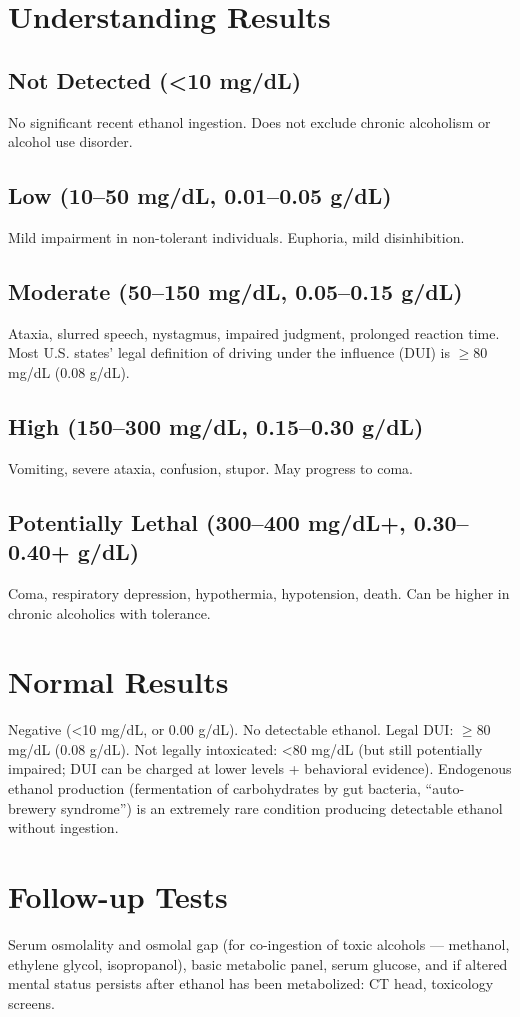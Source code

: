 \section*{Understanding Results}
\subsection*{Not Detected (<10 mg/dL)}
No significant recent ethanol ingestion. Does not exclude chronic alcoholism or alcohol use disorder.
\subsection*{Low (10--50 mg/dL, 0.01--0.05 g/dL)}
Mild impairment in non-tolerant individuals. Euphoria, mild disinhibition.
\subsection*{Moderate (50--150 mg/dL, 0.05--0.15 g/dL)}
Ataxia, slurred speech, nystagmus, impaired judgment, prolonged reaction time. Most U.S. states' legal definition of driving under the influence (DUI) is $\geq$80 mg/dL (0.08 g/dL).
\subsection*{High (150--300 mg/dL, 0.15--0.30 g/dL)}
Vomiting, severe ataxia, confusion, stupor. May progress to coma.
\subsection*{Potentially Lethal (300--400 mg/dL+, 0.30--0.40+ g/dL)}
Coma, respiratory depression, hypothermia, hypotension, death. Can be higher in chronic alcoholics with tolerance.
\section*{Normal Results}
Negative (<10 mg/dL, or 0.00 g/dL). No detectable ethanol. Legal DUI: $\geq$80 mg/dL (0.08 g/dL). Not legally intoxicated: <80 mg/dL (but still potentially impaired; DUI can be charged at lower levels + behavioral evidence). Endogenous ethanol production (fermentation of carbohydrates by gut bacteria, ``auto-brewery syndrome'') is an extremely rare condition producing detectable ethanol without ingestion.
\section*{Follow-up Tests}
Serum osmolality and osmolal gap (for co-ingestion of toxic alcohols --- methanol, ethylene glycol, isopropanol), basic metabolic panel, serum glucose, and if altered mental status persists after ethanol has been metabolized: CT head, toxicology screens.
